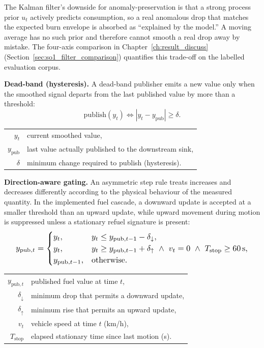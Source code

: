 The Kalman filter's downside for anomaly-preservation is that a strong process prior $u_t$ actively predicts consumption, so a real anomalous drop that matches the expected burn envelope is absorbed as ``explained by the model.'' A moving average has no such prior and therefore cannot smooth a real drop away by mistake. The four-axis comparison in Chapter~\ref{ch:result_discuss} (Section~\ref{sec:so1_filter_comparison}) quantifies this trade-off on the labelled evaluation corpus.

\textbf{Dead-band (hysteresis).} A dead-band publisher emits a new value only when the smoothed signal departs from the last published value by more than a threshold:
%
\begin{equation}
\mathrm{publish}(y_t) \Leftrightarrow |y_t - y_{\mathrm{pub}}| \geq \delta.
\label{eq:deadband-ch3}
\end{equation}
\begin{tabular}{@{}r@{~=~}l@{}}
$y_t$ & current smoothed value, \\
$y_{\mathrm{pub}}$ & last value actually published to the downstream sink, \\
$\delta$ & minimum change required to publish (hysteresis).
\end{tabular}

\vspace{0.5em}
\textbf{Direction-aware gating.} An asymmetric step rule treats increases and decreases differently according to the physical behaviour of the measured quantity. In the implemented fuel cascade, a downward update is accepted at a smaller threshold than an upward update, while upward movement during motion is suppressed unless a stationary refuel signature is present:
\begin{equation}
\resizebox{0.95\hsize}{!}{$\displaystyle
y_{\mathrm{pub},t} =
\begin{cases}
y_t, & y_t \leq y_{\mathrm{pub},t-1} - \delta_{\downarrow}, \\
y_t, & y_t \geq y_{\mathrm{pub},t-1} + \delta_{\uparrow}\ \land\ v_t = 0\ \land\ T_{\mathrm{stop}} \geq 60\,\mathrm{s}, \\
y_{\mathrm{pub},t-1}, & \text{otherwise}.
\end{cases}
$}
\label{eq:direction-aware-ch3}
\end{equation}
\begin{tabular}{@{}r@{~=~}l@{}}
$y_{\mathrm{pub},t}$ & published fuel value at time $t$, \\
$\delta_{\downarrow}$ & minimum drop that permits a downward update, \\
$\delta_{\uparrow}$ & minimum rise that permits an upward update, \\
$v_t$ & vehicle speed at time $t$ (km/h), \\
$T_{\mathrm{stop}}$ & elapsed stationary time since last motion (s).
\end{tabular}

